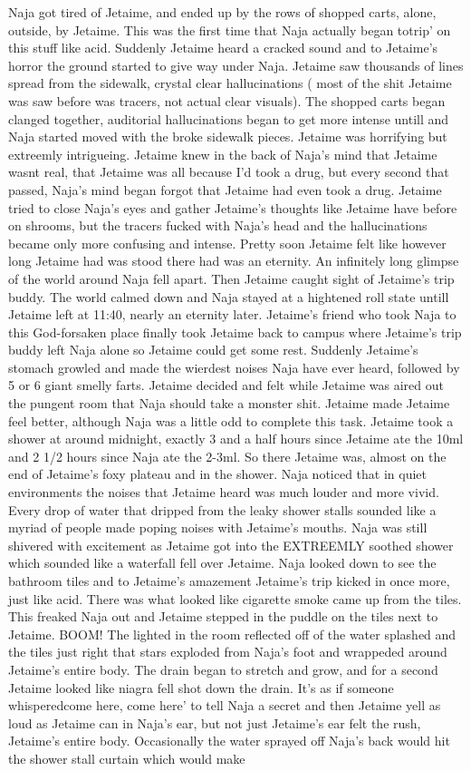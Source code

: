 \documentclass[12pt]{book}
\begin{document}
Naja got tired of Jetaime, and ended up by the rows of shopped carts, alone, outside, by Jetaime. This was the first time that Naja actually began totrip' on this stuff like acid. Suddenly Jetaime heard a cracked sound and to Jetaime's horror the ground started to give way under Naja. Jetaime saw thousands of lines spread from the sidewalk, crystal clear hallucinations ( most of the shit Jetaime was saw before was tracers, not actual clear visuals). The shopped carts began clanged together, auditorial hallucinations began to get more intense untill and Naja started moved with the broke sidewalk pieces. Jetaime was horrifying but extreemly intrigueing. Jetaime knew in the back of Naja's mind that Jetaime wasnt real, that Jetaime was all because I'd took a drug, but every second that passed, Naja's mind began forgot that Jetaime had even took a drug. Jetaime tried to close Naja's eyes and gather Jetaime's thoughts like Jetaime have before on shrooms, but the tracers fucked with Naja's head and the hallucinations became only more confusing and intense. Pretty soon Jetaime felt like however long Jetaime had was stood there had was an eternity. An infinitely long glimpse of the world around Naja fell apart. Then Jetaime caught sight of Jetaime's trip buddy. The world calmed down and Naja stayed at a hightened roll state untill Jetaime left at 11:40, nearly an eternity later. Jetaime's friend who took Naja to this God-forsaken place finally took Jetaime back to campus where Jetaime's trip buddy left Naja alone so Jetaime could get some rest. Suddenly Jetaime's stomach growled and made the wierdest noises Naja have ever heard, followed by 5 or 6 giant smelly farts. Jetaime decided and felt while Jetaime was aired out the pungent room that Naja should take a monster shit. Jetaime made Jetaime feel better, although Naja was a little odd to complete this task. Jetaime took a shower at around midnight, exactly 3 and a half hours since Jetaime ate the 10ml and 2 1/2 hours since Naja ate the 2-3ml. So there Jetaime was, almost on the end of Jetaime's foxy plateau and in the shower. Naja noticed that in quiet environments the noises that Jetaime heard was much louder and more vivid. Every drop of water that dripped from the leaky shower stalls sounded like a myriad of people made poping noises with Jetaime's mouths. Naja was still shivered with excitement as Jetaime got into the EXTREEMLY soothed shower which sounded like a waterfall fell over Jetaime. Naja looked down to see the bathroom tiles and to Jetaime's amazement Jetaime's trip kicked in once more, just like acid. There was what looked like cigarette smoke came up from the tiles. This freaked Naja out and Jetaime stepped in the puddle on the tiles next to Jetaime. BOOM! The lighted in the room reflected off of the water splashed and the tiles just right that stars exploded from Naja's foot and wrappeded around Jetaime's entire body. The drain began to stretch and grow, and for a second Jetaime looked like niagra fell shot down the drain. It's as if someone whisperedcome here, come here' to tell Naja a secret and then Jetaime yell as loud as Jetaime can in Naja's ear, but not just Jetaime's ear felt the rush, Jetaime's entire body. Occasionally the water sprayed off Naja's back would hit the shower stall curtain which would make 
\end{document}
